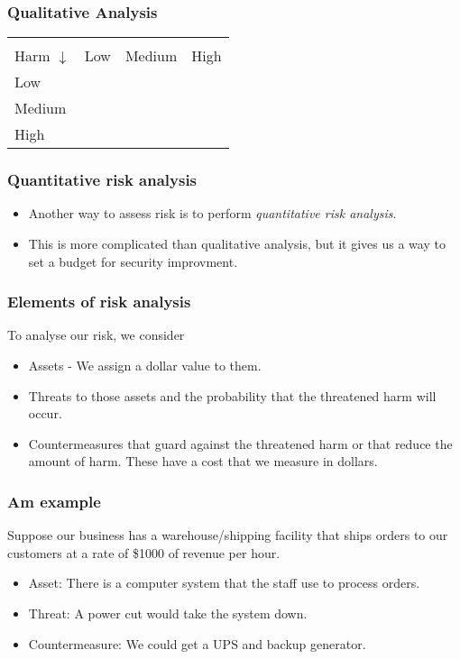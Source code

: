\documentclass[10pt]{beamer}
\begin{document}
\begin{frame}
	\frametitle{Qualitative Analysis}

	\begin{tabularx}{\textwidth}{|X|X|X|X|}
		\hline
		\begin{tabular}{ll} Probability $\rightarrow$ \\ Harm $\downarrow$ \end{tabular} &  Low & Medium & High \\ \hline
		Low & \cellcolor{green} & \cellcolor{green} & \cellcolor{yellow} \\ \hline
		Medium & \cellcolor{green}  & \cellcolor{yellow} & \cellcolor{red} \\  \hline
		High & \cellcolor{yellow} & \cellcolor{red} & \cellcolor{red} \\ \hline
	\end{tabularx}
\end{frame}
\begin{frame}
	\frametitle{Quantitative risk analysis}

	\begin{itemize}
		\item Another way to assess risk is to perform \emph{quantitative risk analysis}.
		\item This is more complicated than qualitative analysis, but it gives us a
		      way to set a budget for security improvment.
	\end{itemize}
\end{frame}

\begin{frame}
	\frametitle{Elements of risk analysis}

	To analyse our risk, we consider

	\begin{itemize}
		\item Assets - We assign a dollar value to them.
		\item Threats to those assets and the probability that
			the threatened harm will occur.
		\item Countermeasures that guard against the threatened harm
			or that reduce the amount of harm.  These
			have a cost that we measure in dollars.
	\end{itemize}
\end{frame}

\begin{frame}
	\frametitle{Am example}
	Suppose our business has a warehouse/shipping facility
	that ships orders to our customers at a rate of 
	\$1000 of revenue per hour.

	\begin{itemize}
		\item Asset:  There is a computer system that the staff
			use to process orders.
		\item Threat:  A power cut would take the system down.
		\item Countermeasure:  We could get a UPS and backup generator.
	\end{itemize}
\end{frame}
\end{document}
